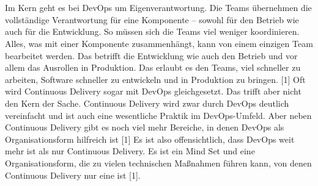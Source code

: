 \\ \\Im Kern geht es bei DevOps um Eigenverantwortung. Die Teams übernehmen die vollständige Verantwortung für eine Komponente – sowohl für den Betrieb wie auch für die Entwicklung. So müssen sich die Teams viel weniger koordinieren. Alles, was mit einer Komponente zusammenhängt, kann von einem einzigen Team bearbeitet werden. Das betrifft die Entwicklung wie auch den Betrieb und vor allem das Ausrollen in Produktion. Das erlaubt es den Teams, viel schneller zu arbeiten, Software schneller zu entwickeln und in Produktion zu bringen. [1]
Oft wird Continuous Delivery sogar mit DevOps gleichgesetzt. Das trifft aber nicht den Kern der Sache. Continuous Delivery wird zwar durch DevOps deutlich vereinfacht und ist auch eine wesentliche Praktik im DevOps-Umfeld. Aber neben Continuous Delivery gibt es noch viel mehr Bereiche, in denen DevOps als Organisationsform hilfreich ist [1]
Es ist also offensichtlich, dass DevOps weit mehr ist als nur Continuous Delivery. Es ist ein Mind Set und eine Organisationsform, die zu vielen technischen Maßnahmen führen kann, von denen Continuous Delivery nur eine ist [1].